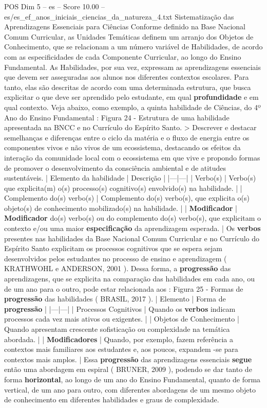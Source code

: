 \begin{textsample}{POS Dim 5 – es – Score 10.00 – es/es\_ef\_anos\_iniciais\_ciencias\_da\_natureza\_4.txt}  \label{ex:f5_pos_106}
Sistematização das Aprendizagens Essenciais para Ciências Conforme definido na Base Nacional Comum Curricular, as Unidades Temáticas definem um arranjo dos Objetos de Conhecimento, que se relacionam a um número variável de Habilidades, de acordo com as especificidades de cada Componente Curricular, ao longo do Ensino Fundamental.
As Habilidades, por sua vez, expressam as aprendizagens essenciais que devem ser asseguradas aos alunos nos diferentes contextos escolares.
Para tanto, elas são descritas de acordo com uma determinada estrutura, que busca explicitar o que deve ser aprendido pelo estudante, em qual \textbf{profundidade} e em qual contexto.
Veja abaixo, como exemplo, a quinta habilidade de Ciências, do 4º Ano do Ensino Fundamental : Figura 24 - Estrutura de uma habilidade apresentada na BNCC e no Currículo do Espírito Santo. > Descrever e destacar semelhanças e diferenças entre o ciclo da matéria e o fluxo de energia entre os componentes vivos e não vivos de um ecossistema, destacando os efeitos da interação da comunidade local com o ecossistema em que vive e propondo formas de promover o desenvolvimento da consciência ambiental e de atitudes sustentáveis. | Elemento da habilidade | Descrição | |---|---| | Verbo(s) | Verbo(s) que explicita(m) o(s) processo(s) cognitivo(s) envolvido(s) na habilidade. | | Complemento do(s) verbo(s) | Complemento do(s) verbo(s), que explicita o(s) objeto(s) de conhecimento mobilizado(s) na habilidade. | | \textbf{Modificador} | \textbf{Modificador} do(s) verbo(s) ou do complemento do(s) verbo(s), que explicitam o contexto e/ou uma maior \textbf{especificação} da aprendizagem esperada. | Os \textbf{verbos} presentes nas habilidades da Base Nacional Comum Curricular e no Currículo do Espírito Santo explicitam os processos cognitivos que se espera sejam desenvolvidos pelos estudantes no processo de ensino e aprendizagem ( KRATHWOHL e ANDERSON, 2001 ).
Dessa forma, a \textbf{progressão} das aprendizagens, que se explicita na comparação das habilidades em cada ano, ou de um ano para o outro, pode estar relacionada aos : Figura 25 - Formas de \textbf{progressão} das habilidades ( BRASIL, 2017 ). | Elemento | Forma de \textbf{progressão} | |---|---| | Processos Cognitivos | Quando os \textbf{verbos} indicam processos cada vez mais ativos ou exigentes. | | Objetos de Conhecimento | Quando apresentam crescente sofisticação ou complexidade na temática abordada. | | \textbf{Modificadores} | Quando, por exemplo, fazem referência a contextos mais familiares aos estudantes e, aos poucos, expandem -se para contextos mais amplos. | Essa \textbf{progressão} das aprendizagens essenciais \textbf{segue} então uma abordagem em espiral ( BRUNER, 2009 ), podendo se dar tanto de forma \textbf{horizontal}, ao longo de um ano do Ensino Fundamental, quanto de forma vertical, de um ano para outro, com diferentes abordagens de um mesmo objeto de conhecimento em diferentes habilidades e graus de complexidade.

\end{textsample}
